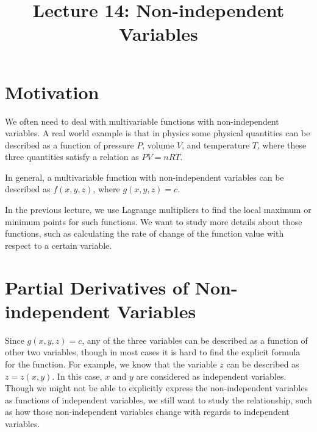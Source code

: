 \documentclass{article}
\title{Lecture 14: Non-independent Variables}
\author{}
\date{}
\begin{document}
    
\maketitle

\section{Motivation}

We often need to deal with multivariable functions with non-independent 
variables. A real world example is that in physics some physical quantities can 
be described as a function of pressure $P$, volume $V$, and temperature $T$, 
where these three quantities satisfy a relation as $PV = nRT$.

In general, a multivariable function with non-independent variables can be 
described as $f(x, y, z)$, where $g(x, y, z) = c$.

In the previous lecture, we use Lagrange multipliers to find the local maximum 
or minimum points for such functions. We want to study more details about those 
functions, such as calculating the rate of change of the function value with 
respect to a certain variable.

\section{Partial Derivatives of Non-independent Variables}

Since $g(x, y, z) = c$, any of the three variables can be described as a 
function of other two variables, though in most cases it is hard to find the 
explicit formula for the function. For example, we know that the variable $z$ 
can be described as $z = z(x, y)$. In this case, $x$ and $y$ are considered as 
independent variables. Though we might not be able to explicitly express the 
non-independent variables as functions of independent variables, we still want 
to study the relationship, such as how those non-independent variables change 
with regards to independent variables.
\end{document}
